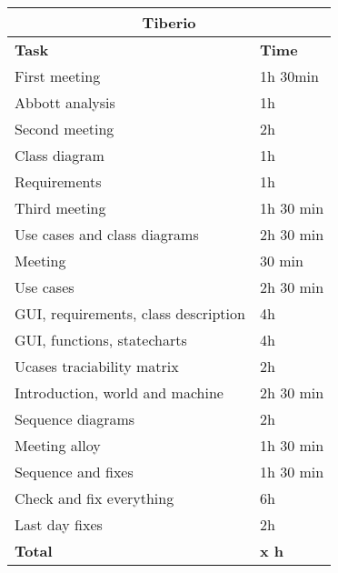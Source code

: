 \begin{table}[H]
\begin{tabular}{|l|l|}
\hline
\multicolumn{2}{|c|}{\textbf{Tiberio}}            \\ \hline
\textbf{Task}                   & \textbf{Time} \\ \hline
First meeting                        & 1h 30min     \\ \hline
Abbott analysis                      & 1h        \\ \hline
Second meeting                       & 2h        \\ \hline
Class diagram                        & 1h        \\ \hline
Requirements                         & 1h        \\ \hline
Third meeting                        & 1h 30 min \\ \hline
Use cases and class diagrams         & 2h 30 min \\ \hline
Meeting                              & 30 min    \\ \hline
Use cases                            & 2h 30 min \\ \hline
GUI, requirements, class description & 4h        \\ \hline
GUI, functions, statecharts          & 4h        \\ \hline
Ucases traciability matrix           & 2h        \\ \hline
Introduction, world and machine      & 2h 30 min \\ \hline
Sequence diagrams                    & 2h        \\ \hline
Meeting alloy                        & 1h 30 min \\ \hline
Sequence and fixes                   & 1h 30 min \\ \hline
Check and fix everything             & 6h        \\ \hline
Last day fixes                       & 2h        \\ \hline
\rowcolor {polilight}
\textbf{Total}                  & \textbf{x h}   \\ \hline
\end{tabular}
\end{table}


